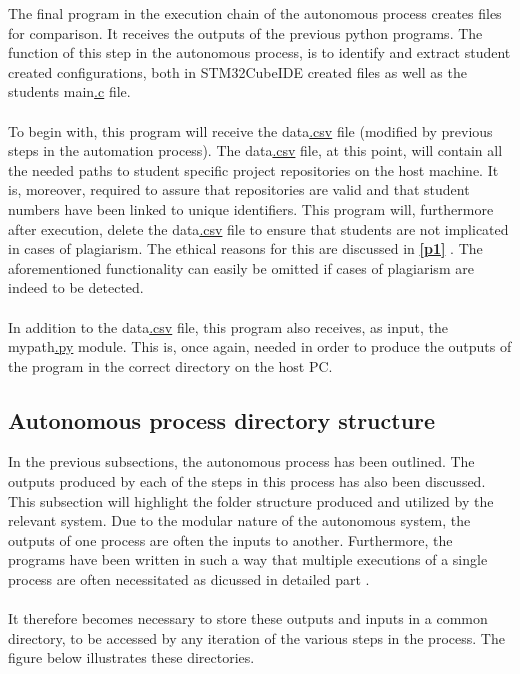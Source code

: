 The final program in the execution chain of the autonomous process creates files for comparison. It receives the outputs of the previous python programs. The function of this step in the autonomous process, is to identify and extract student created configurations, both in STM32CubeIDE created files as well as the students main\hyperref[listAbr]{.c} file.
\\\\
To begin with, this program will receive the data\hyperref[listExt]{.csv} file (modified by previous steps in the automation process). The data\hyperref[listExt]{.csv} file, at this point, will contain all the needed paths to student specific project repositories on the host machine. It is, moreover, required to assure that repositories are valid and that student numbers have been linked to unique identifiers. This program will, furthermore after execution, delete the data\hyperref[listExt]{.csv} file to ensure that students are not implicated in cases of plagiarism. The ethical reasons for this are discussed in \textbf{\ref{p1} }. The aforementioned functionality can easily be omitted if cases of plagiarism are indeed to be detected. 
\\\\
In addition to the data\hyperref[listExt]{.csv} file, this program also receives, as input, the mypath\hyperref[listExt]{.py} module. This is, once again, needed in order to produce the outputs of the program in the correct directory on the host PC.

\subsection{Autonomous process directory structure}
\label{p4}
In the previous subsections, the autonomous process has been outlined. The outputs produced by each of the steps in this process has also been discussed. This subsection will highlight the folder structure produced and utilized by the relevant system. Due to the modular nature of the autonomous system, the outputs of one process are often the inputs to another. Furthermore, the programs have been written in such a way that multiple executions of a single process are often necessitated \color{green} as dicussed in detailed part \color{black}.
\\\\
It therefore becomes necessary to store these outputs and inputs in a common directory, to be accessed by any iteration of the various steps in the process. The figure below illustrates these directories.

